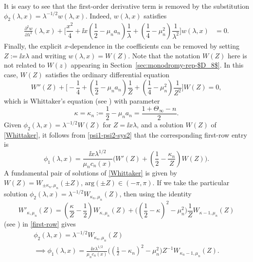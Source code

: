 It is easy to see that the first-order derivative term is removed by the substitution $\phi_2(\lambda,x)=\lambda^{-1/2}w(\lambda,x)$.
Indeed, $w(\lambda,x)$ satisfies
\begin{align*}
 \frac{\partial^2w}{\partial\lambda^2}(\lambda,x) + \bigg[ \dfrac{x^2}{4} + \ii x\left( \dfrac{1}{2} - \mu_n a_n \right) \dfrac{1}{\lambda} + \left( \dfrac{1}{4} - \mu_n^2 \right) \dfrac{1}{\lambda^2} \bigg]w(\lambda,x) &= 0.
\end{align*}
Finally, the explicit $x$-dependence in the coefficients can be removed by setting $Z:= \ii x \lambda$ and writing $w(\lambda,x)=W(Z)$. Note that the notation $W(Z)$ here is not related to $W(z)$ appearing in Section~\ref{sec:monodromy-rep-$D_8$}. In this case, $W(Z)$ satisfies the ordinary differential equation
\begin{equation}
 W''(Z) + \bigg[ - \dfrac{1}{4} + \left( \dfrac{1}{2} - \mu_n a_n \right) \dfrac{1}{Z} + \left( \dfrac{1}{4} - \mu_n^2 \right) \dfrac{1}{Z^2} \bigg] W(Z) = 0,
 \label{Whittaker}
\end{equation}
which is Whittaker's equation (see \cite[Chapter~13]{DLMF}) with parameter
\begin{equation}\label{kappa-mu}
 \kappa = \kappa_n:=\frac{1}{2} - \mu_n a_n = \dfrac{1+\Theta_\infty - n }{2}.
\end{equation}
Given $\phi_2(\lambda,x)=\lambda^{-1/2}W(Z)$ for $Z=\ii x\lambda$, and a solution $W(Z)$ of \eqref{Whittaker}, it follows from \eqref{psi1-psi2-sys2} that the corresponding first-row entry is
\begin{equation}
 \phi_1(\lambda,x)=\frac{\ii x\lambda^{1/2}}{\mu_n c_n(x)}\bigg(W'(Z)+\left(\frac{1}{2}-\frac{\kappa_n}{Z}\right)W(Z)\bigg).
 \label{first-row}
\end{equation}
A fundamental pair of solutions of \eqref{Whittaker} is given by $W(Z)=W_{\pm \kappa_n, \mu_n} (\pm Z)$, $\mathrm{arg}(\pm Z) \in (-\pi, \pi) $.
If we take the particular solution $\phi_2(\lambda,x)=\lambda^{-1/2}W_{\kappa_n,\mu_n}(Z)$, then
using the identity
\begin{equation*}
 W'_{\kappa,\mu_n}(Z)=\left(\dfrac{\kappa}{Z}-\dfrac{1}{2}\right)W_{\kappa,\mu_n}(Z)+\bigg(\left(\dfrac{1}{2}-\kappa\right)^2-\mu_n^2\bigg)\frac{1}{Z}W_{\kappa-1,\mu_n}(Z)
\end{equation*}
(see \cite[equation~(13.15.23)]{DLMF}) in \eqref{first-row} gives
\begin{gather*}
 \phi_2(\lambda,x)=\lambda^{-1/2}W_{\kappa_n,\mu_n}(Z)\\
\implies \phi_1(\lambda,x)=\frac{\ii x\lambda^{1/2}}{\mu_n c_n(x)}\bigg(\left(\frac{1}{2}-\kappa_n\right)^2-\mu_n^2\bigg)Z^{-1}W_{\kappa_n-1,\mu_n}(Z).
\end{gather*}
